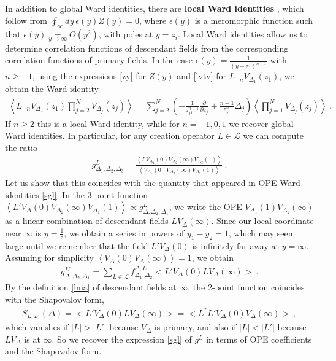 \documentclass[12pt, a4paper]{article}
\newcommand{\myindex}[1]{\textbf{\boldmath #1}}
\theoremstyle{break}
\begin{document}
In addition to global Ward identities, there are \myindex{local Ward identities} , which follow from $\oint_\infty dy\ \epsilon(y)Z(y)=0$, where $\epsilon(y)$ is a meromorphic function such that $\epsilon(y)\underset{y\to\infty}{=}O(y^2)$, with poles at $y=z_i$. Local Ward identities allow us to determine correlation functions of descendant fields from the corresponding correlation functions of primary fields. In the case $\epsilon(y) = \frac{1}{(y-z_1)^{n-1}}$ with $n\geq -1$, using the expressions \eqref{zy} for $Z(y)$ and \eqref{lvtv} for $L_{-n}V_{\Delta_1}(z_1)$, we obtain the Ward identity
\begin{align}
 \left<L_{-n}V_{\Delta_1}(z_1)\prod_{j=2}^N V_{\Delta_j}(z_j)\right> = \sum_{j=2}^N \left(-\frac{1}{z_{j1}^{n-1}}\frac{\partial}{\partial z_j} +\frac{n-1}{z_{j1}^n} \Delta_j\right) \left<\prod_{j=1}^N V_{\Delta_j}(z_j)\right>\ . 
 \label{lwi}
\end{align}
If $n\geq 2$ this is a local Ward identity, while for $n=-1,0,1$ we recover global Ward identities. 
In particular, for any creation operator $L\in\mathcal{L}$ we can compute the ratio
\begin{align}
 g^L_{\Delta_1,\Delta_2,\Delta_3} = \frac{\left< LV_{\Delta_1}(0) V_{\Delta_2}(\infty)V_{\Delta_3}(1)\right>}{\left< V_{\Delta_1}(0) V_{\Delta_2}(\infty)V_{\Delta_3}(1)\right>}\ .
 \label{gl}
\end{align}
Let us show that this coincides with the quantity that appeared in OPE Ward identities \eqref{sgl}. 
In the 3-point function $\left< L'V_\Delta(0)V_{\Delta_2}(\infty)V_{\Delta_1}(1)\right>\propto g^{L'}_{\Delta,\Delta_2,\Delta_1}$, we write the OPE $V_{\Delta_1}(1)V_{\Delta_2}(\infty)$ as a linear combination of descendant fields $LV_{\Delta}(\infty)$. Since our local coordinate near $\infty$ is $y=\frac{1}{z}$, we obtain a series in powers of $y_1-y_2=1$, which may seem large until we remember that the field $L'V_{\Delta}(0)$ is infinitely far away at $y=\infty$. 
Assuming for simplicity $\left<V_\Delta(0) V_\Delta(\infty) \right>=1$, 
we obtain
\begin{align}
 g^{L'}_{\Delta,\Delta_2,\Delta_1}= \sum_{L\in\mathcal{L}} f^{\Delta,L}_{\Delta_1,\Delta_2} \Big<L'V_\Delta(0) LV_\Delta(\infty) \Big> \ .
 \label{gfr}
\end{align}
By the definition \eqref{lnia} of descendant fields at $\infty$, the 2-point function coincides with the Shapovalov form, 
\begin{align}
 \boxed{S_{L,L'}(\Delta)  = \Big<L'V_\Delta(0) LV_\Delta(\infty) \Big> =  \Big<L^*L'V_\Delta(0) V_\Delta(\infty) \Big>} \ , 
 \label{sll}
 \end{align}
which vanishes if $|L|>|L'|$ because $V_\Delta$ is primary, and also if $|L|<|L'|$ because $LV_\Delta$ is at $\infty$. So we recover the expression \eqref{sgl} of $g^L$ in terms of OPE coefficients and the Shapovalov form. 
\end{document}
